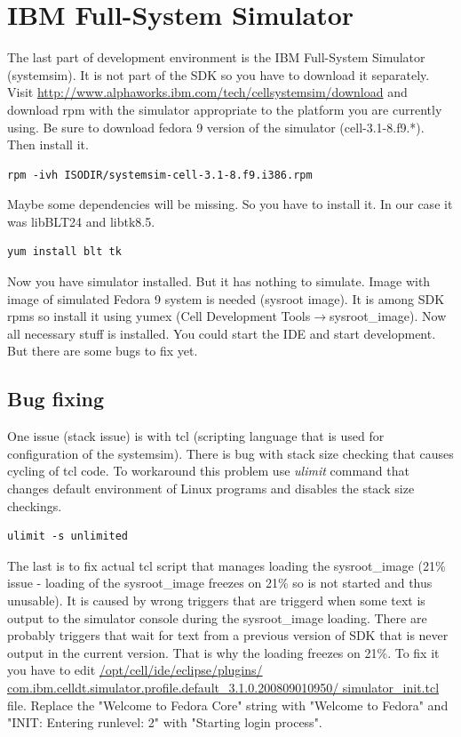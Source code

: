 \section{IBM Full-System Simulator}

The last part of development environment is the IBM Full-System Simulator (systemsim).
It is not part of the SDK so you have to download it separately.
Visit \url{http://www.alphaworks.ibm.com/tech/cellsystemsim/download} and download rpm with the simulator appropriate to the platform you are currently using.
Be sure to download fedora 9 version of the simulator (cell-3.1-8.f9.*).
Then install it.

\begin{verbatim}
rpm -ivh ISODIR/systemsim-cell-3.1-8.f9.i386.rpm
\end{verbatim}

Maybe some dependencies will be missing. So you have to install it. In our case it was libBLT24 and libtk8.5.

\begin{verbatim}
yum install blt tk
\end{verbatim}

Now you have simulator installed.
But it has nothing to simulate.
Image with image of simulated Fedora 9 system is needed (sysroot image).
It is among SDK rpms so install it using yumex (Cell Development Tools$\rightarrow$sysroot\_image).
Now all necessary stuff is installed.
You could start the IDE and start development.
But there are some bugs to fix yet.

\subsection{Bug fixing}

\par
One issue (stack issue) is with tcl (scripting language that is used for configuration of the systemsim).
There is bug with stack size checking that causes cycling of tcl code.
To workaround this problem use \emph{ulimit} command that changes default environment of Linux programs and disables the stack size checkings.

\begin{verbatim}
ulimit -s unlimited
\end{verbatim}

\par
The last is to fix actual tcl script that manages loading the sysroot\_image (21\% issue - loading of the sysroot\_image freezes on 21\% so is not started and thus unusable).
It is caused by wrong triggers that are triggerd when some text is output to the simulator console during the sysroot\_image loading.
There are probably triggers that wait for text from a previous version of SDK that is never output in the current version.
That is why the loading freezes on 21\%.
To fix it you have to edit \url{/opt/cell/ide/eclipse/plugins/ com.ibm.celldt.simulator.profile.default_3.1.0.200809010950/ simulator_init.tcl} file.
Replace the "Welcome to Fedora Core" string with "Welcome to Fedora" and "INIT: Entering runlevel: 2" with "Starting login process".

